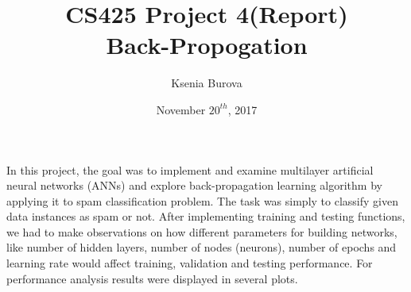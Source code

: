 \documentclass[12pt, letterpaper]{article}
\title{CS425 Project 4(Report)\\Back-Propogation}
\author{Ksenia Burova}
\date{November \(20^{th}\), 2017}
\begin{document}
\maketitle

 In this project, the goal was to implement and examine multilayer artificial neural networks (ANNs) and explore back-propagation learning algorithm by applying it to spam classification problem. The task was simply to classify given data instances as spam or not. After implementing training and testing functions, we had to make observations on how different parameters for building networks, like number of hidden layers, number of nodes (neurons), number of epochs and learning rate would affect training, validation and testing performance. For performance analysis results were displayed in several plots.
\end{document}
